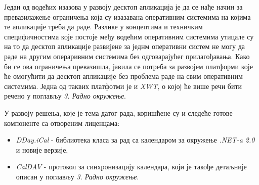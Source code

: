 Један од водећих изазова у развоју десктоп апликација је да се нађе начин за превазилажење ограничења која су изазавана оперативним системима на којима те апликације треба да раде. Разлике у концептима и техничким специфичностима које постоје међу водећим оперативним системима утицале су на то да десктоп апликације развијене за једнм оперативни систем не могу да раде на другим операривним системима без одговарајућег прилагођавања. Како би се ова ограничења превазишла, јавила се потреба за развојем платформи које ће омогућити да десктоп апликације без проблема раде на свим оперативним системима. Једна од таквих платфотми је и \textit{XWT}\cite{xwt}, о којој ће више речи бити речено у поглављу \textit{3. Радно окружење}.

У развоју решења, које је тема датог рада, коришћене су и следеће готове компоненте са отвореним лиценцама:
\begin{itemize}
	\item {\textit{DDay.iCal}\cite{dday} - библиотека класа за рад са календаром за окружење \textit{.NET-a 2.0} и новије верзије},
	\item {\textit{CalDAV}\cite{caldav} - протокол за синхронизацију календара, који је такође детаљније описан у поглављу \textit{3. Радно окружење}}.
\end{itemize}